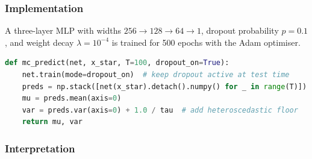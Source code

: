 \documentclass{article}
\begin{document}
\subsubsection*{Implementation}

A three-layer MLP with widths $256 \to 128 \to 64 \to 1$, dropout probability $p = 0.1$, and weight decay $\lambda = 10^{-4}$ is trained for 500 epochs with the Adam optimiser.

\begin{lstlisting}[language=Python]
def mc_predict(net, x_star, T=100, dropout_on=True):
    net.train(mode=dropout_on)  # keep dropout active at test time
    preds = np.stack([net(x_star).detach().numpy() for _ in range(T)])
    mu = preds.mean(axis=0)
    var = preds.var(axis=0) + 1.0 / tau  # add heteroscedastic floor
    return mu, var
\end{lstlisting}

\subsubsection*{Interpretation}
\end{document}
